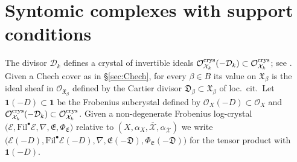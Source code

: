 \documentclass[asterisque,english]{smfart}
\begin{document}


\section{Syntomic complexes with support conditions}
\label{sec:compactsupport}


The divisor $\mathcal{D}_k$ defines a crystal of invertible ideals $\mathcal{O}_{\mathcal{X}_k}^{\rm crys}(-\mathcal{D}_k) \subset \mathcal{O}_{\mathcal{X}_k}^{\rm crys} $; see \cite[Def. 4.3 \& Rmk, 4.5]{EY}. Given a Chech cover as in \S \ref{sec:Chech}, for every $\beta\in B$  its value on  $\mathfrak{X}_\beta$ is the ideal sheaf in $\mathcal{O}_{\mathfrak{X}_\beta}$  defined by the Cartier divisor $\mathfrak{D}_{\beta}\subset \mathfrak{X}_\beta$ of loc.~cit.~Let $\mathbf{1}(-D)\subset \mathbf{1}$ be the Frobenius subcrystal defined by $\mathcal{O}_{X}(-D)\subset \mathcal{O}_{X}$ and $\mathcal{O}_{\mathcal{X}_k}^{\rm crys}(-\mathcal{D}_k) \subset \mathcal{O}_{\mathcal{X}_k}^{\rm crys} $. Given  a non-degenerate Frobenius log-crystal  $ \bigl(\mathcal{E},\mathrm{Fil}^\bullet \mathcal{E}, \nabla,\mathfrak{E},\Phi_{\mathfrak{E}}\bigr)$ relative to $(X,\alpha_X,\overline{\mathcal{X}},\alpha_{\overline{\mathcal{X}}})$  we write $ \bigl(\mathcal{E}(-D),\mathrm{Fil}^\bullet \mathcal{E}(-D), \nabla,\mathfrak{E}(-\mathfrak{D}),\Phi_{\mathfrak{E}}(-\mathfrak{D})\bigr)$ for the tensor product with $\mathbf{1}(-D)$. 
\end{document}
